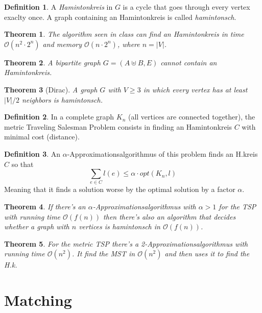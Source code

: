 \documentclass[12pt]{extarticle}
\theoremstyle{definition}
\newtheorem{definition}{Definition}
\theoremstyle{remark}
\theoremstyle{plain}
\newtheorem{theorem}{Theorem}
\newcommand{\BO}{\mathcal{O}}
\begin{document}
\begin{definition}
    A \textit{Hamintonkreis} in $G$ is a cycle that goes through every vertex exaclty once.
    A graph containing an Hamintonkreis is called \textit{hamintonsch}.
\end{definition}

\begin{theorem}
    The algorithm seen in class can find an Hamintonkreis in time $\BO(n^2 \cdot 2^n)$ and memory $\BO(n \cdot 2^n)$, where $n = |V|$.
\end{theorem}

\begin{theorem}
    A bipartite graph $G = (A \uplus B, E)$ cannot contain an Hamintonkreis.
\end{theorem}

\begin{theorem}[Dirac]
    A graph $G$ with $V \ge 3$ in which every vertex has at least $|V|/2$ neighbors is \textit{hamintonsch}.
\end{theorem}

\begin{definition}
    In a complete graph $K_n$ (all vertices are connected together),
    the metric Traveling Salesman Problem consists in finding an
    Hamintonkreis $C$ with minimal cost (distance).
\end{definition}

\begin{definition}
    An $\alpha$-Approximationsalgorithmus of this problem finds an H.kreis $C$ so that
    \[ \sum_{e \in C} l(e) \le \alpha \cdot opt(K_n, l) \]
    Meaning that it finds a solution worse by the optimal solution by a factor $\alpha$.
\end{definition}

\begin{theorem}
    If there's an $\alpha$-Approximationsalgorithmus with $\alpha > 1$ for the TSP with running time $\BO(f(n))$ then there's
    also an algorithm that decides whether a graph with $n$ vertices is hamintonsch in $\BO(f(n))$.
\end{theorem}
\begin{theorem}
    For the metric TSP there's a 2-Approximationsalgorithmus with running time $\BO(n^2)$.
    It find the MST in $\BO(n^2)$ and then uses it to find the H.k.
\end{theorem}

\section{Matching}
\end{document}
